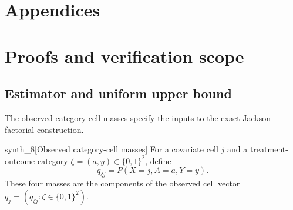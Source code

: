 \documentclass[11pt]{article}
\begin{document}
\appendix

\section*{Appendices}

\section{Proofs and verification scope}

\subsection{Estimator and uniform upper bound}

The observed category-cell masses specify the inputs to the exact Jackson--factorial construction.

\begin{definitionv}{synth_8}[Observed category-cell masses]
For a covariate cell \(j\) and a treatment-outcome category \(\zeta=(a,y)\in\{0,1\}^2\), define
\[
q_{\zeta j}=P(X=j,A=a,Y=y).
\]
These four masses are the components of the observed cell vector \(q_j=(q_{\zeta j}:\zeta\in\{0,1\}^2)\).
\end{definitionv}
\end{document}
